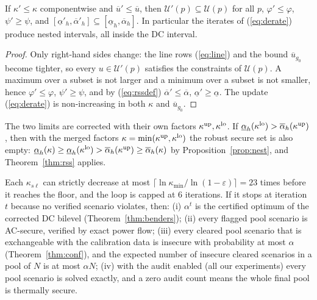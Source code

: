 \begin{proposition}[Nesting]\label{prop:nest}
If $\kappa'\le\kappa$ componentwise and $\overline u'\le\overline u$, then
$\mathcal U'(p)\subseteq\mathcal U(p)$ for all $p$, $\varphi'\le\varphi$, $\psi'\ge\psi$, and
$[\underline\alpha'_h,\overline\alpha'_h]\subseteq[\underline\alpha_h,\overline\alpha_h]$.
In particular the iterates of (\ref{eq:derate}) produce nested intervals, all inside the
DC interval.
\end{proposition}
\begin{proof}
Only right-hand sides change: the line rows (\ref{eq:line}) and the bound $\overline u_{g_0}$
become tighter, so every $u\in\mathcal U'(p)$ satisfies the constraints of $\mathcal U(p)$.
A maximum over a subset is not larger and a minimum over a subset is not smaller, hence
$\varphi'\le\varphi$, $\psi'\ge\psi$, and by (\ref{eq:rssdef}) $\overline\alpha'\le\overline\alpha$,
$\underline\alpha'\ge\underline\alpha$. The update (\ref{eq:derate}) is non-increasing in both
$\kappa$ and $\overline u_{g_0}$.
\end{proof}
\begin{corollary}\label{cor:empty}
The two limits are corrected with their own factors $\kappa^{\rm up},\kappa^{\rm lo}$. If
$\underline\alpha_h(\kappa^{\rm lo})>\overline\alpha_h(\kappa^{\rm up})$, then with the merged factors
$\kappa=\min(\kappa^{\rm up},\kappa^{\rm lo})$ the robust secure set is also empty:
$\underline\alpha_h(\kappa)\ge\underline\alpha_h(\kappa^{\rm lo})>\overline\alpha_h(\kappa^{\rm up})\ge\overline\alpha_h(\kappa)$
by Proposition~\ref{prop:nest}, and Theorem~\ref{thm:rss} applies.
\end{corollary}
\begin{proposition}\label{prop:loop}
Each $\kappa_{s\ell}$ can strictly decrease at most
$\lceil\ln\kappa_{\min}/\ln(1-\varepsilon)\rceil=23$
times before it reaches the floor, and the
loop is capped at 6 iterations. If it stops at iteration $t$ because no verified scenario
violates, then: (i) $\alpha^t$ is the certified optimum of the corrected DC bilevel
(Theorem~\ref{thm:benders}); (ii) every flagged pool scenario is AC-secure, verified by exact
power flow; (iii) every cleared pool scenario that is exchangeable with the calibration
data is insecure with probability at most $\alpha$ (Theorem~\ref{thm:conf}), and the expected
number of insecure cleared scenarios in a pool of $N$ is at most $\alpha N$; (iv) with the
audit enabled (all our experiments) every pool scenario is solved exactly, and a zero
audit count means the whole final pool is thermally secure.
\end{proposition}
